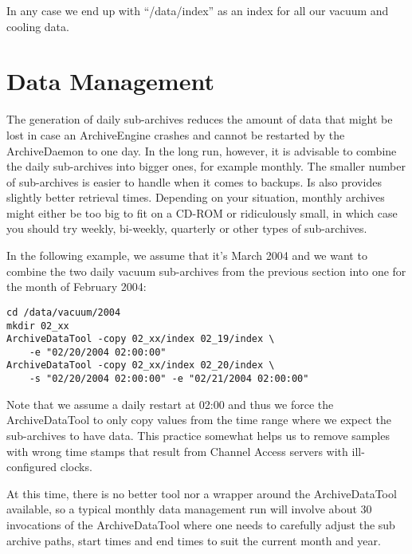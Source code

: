 \noindent In any case we end up with ``/data/index'' as an index for
all our vacuum and cooling data.

\section{Data Management}
The generation of daily sub-archives reduces the amount of data that
might be lost in case an ArchiveEngine crashes and cannot be restarted
by the ArchiveDaemon to one day. In the long run, however, it is
advisable to combine the daily sub-archives into bigger ones, for
example monthly. The smaller number of sub-archives is easier to
handle when it comes to backups. Is also provides slightly better
retrieval times. Depending on your situation, monthly archives might either
be too big to fit on a CD-ROM or ridiculously small, in which case you
should try weekly, bi-weekly, quarterly or other types of sub-archives.

In the following example, we assume that it's March 2004 and we want
to combine the two daily vacuum sub-archives from the previous section
into one for the month of February 2004:
\begin{lstlisting}[frame=none,keywordstyle=\sffamily]
cd /data/vacuum/2004
mkdir 02_xx
ArchiveDataTool -copy 02_xx/index 02_19/index \
    -e "02/20/2004 02:00:00"
ArchiveDataTool -copy 02_xx/index 02_20/index \
    -s "02/20/2004 02:00:00" -e "02/21/2004 02:00:00"
\end{lstlisting}
\noindent Note that we assume a daily restart at 02:00 and thus we
force the ArchiveDataTool to only copy values from the time range
where we expect the sub-archives to have data. This practice somewhat
helps us to remove samples with wrong time stamps that result from
Channel Access servers with ill-configured clocks.

At this time, there is no better tool nor a wrapper around the
ArchiveDataTool available, so a typical monthly data management run
will involve about 30 invocations of the ArchiveDataTool where one
needs to carefully adjust the sub archive paths, start times and end
times to suit the current month and year.

